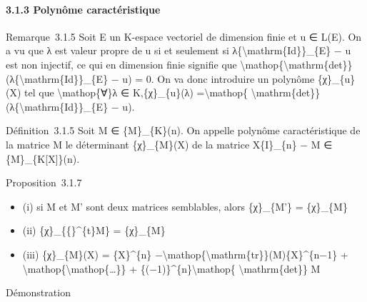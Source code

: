 \documentclass[]{article}
\begin{document}
\paragraph{3.1.3 Polynôme caractéristique}

Remarque~3.1.5 Soit E un K-espace vectoriel de dimension finie et u ∈
L(E). On a vu que λ est valeur propre de u si et seulement si
λ\{\textbackslash{}mathrm\{Id\}\}\_\{E\} − u est non injectif, ce qui en
dimension finie signifie que
\textbackslash{}mathop\{\textbackslash{}mathrm\{det\}\}
(λ\{\textbackslash{}mathrm\{Id\}\}\_\{E\} − u) = 0. On va donc
introduire un polynôme \{χ\}\_\{u\}(X) tel que
\textbackslash{}mathop\{∀\}λ ∈ K,\{χ\}\_\{u\}(λ)
=\textbackslash{}mathop\{ \textbackslash{}mathrm\{det\}\}
(λ\{\textbackslash{}mathrm\{Id\}\}\_\{E\} − u).

Définition~3.1.5 Soit M ∈ \{M\}\_\{K\}(n). On appelle polynôme
caractéristique de la matrice M le déterminant \{χ\}\_\{M\}(X) de la
matrice X\{I\}\_\{n\} − M ∈ \{M\}\_\{K{[}X{]}\}(n).

Proposition~3.1.7

\begin{itemize}
\itemsep1pt\parskip0pt
\item
  (i) si M et M' sont deux matrices semblables, alors \{χ\}\_\{M'\} =
  \{χ\}\_\{M\}
\item
  (ii) \{χ\}\_\{\{\}\^{}\{t\}M\} = \{χ\}\_\{M\}
\item
  (iii) \{χ\}\_\{M\}(X) = \{X\}\^{}\{n\}
  −\textbackslash{}mathop\{\textbackslash{}mathrm\{tr\}\}(M)\{X\}\^{}\{n−1\}
  + \textbackslash{}mathop\{\textbackslash{}mathop\{\ldots{}\}\} +
  \{(−1)\}\^{}\{n\}\textbackslash{}mathop\{
  \textbackslash{}mathrm\{det\}\} M
\end{itemize}

Démonstration
\end{document}
